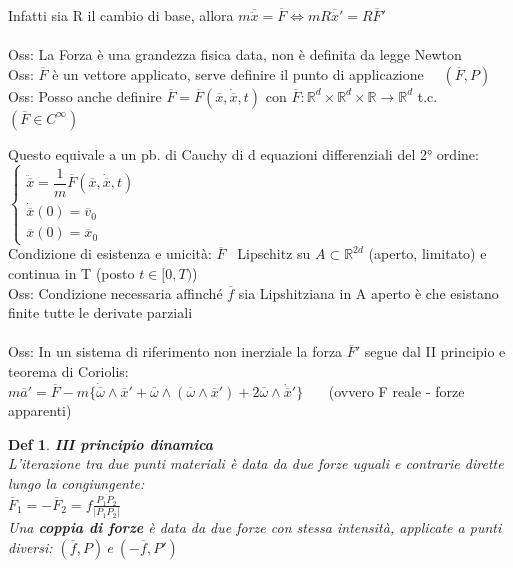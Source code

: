 \documentclass{article}
\theoremstyle{unnumbered}
\newtheorem* {theoremT}{Def}
\theoremstyle{unnumbered1}
\newenvironment{defi}{\begin{gBox}\begin{theoremT}}{\end{theoremT}\end{gBox}}
\begin{document}
Infatti sia R il cambio di base, allora $m\overline{\ddot{x}}=\overline{F} \Leftrightarrow mR\overline{\ddot{x}}'=R\overline{F}'$ \\ \\
%
%
%
Oss: La Forza è una grandezza fisica data, non è definita da legge Newton \\
Oss: $\overline{F}$ è un vettore applicato, serve definire il punto di applicazione \ \ $(\overline{F},P)$\\
Oss: Posso anche definire $\overline{F}=\overline{F}(\overline{x},\dot{\overline{x}},t)$ con $\overline{F}:\mathbb{R}^d\times\mathbb{R}^d\times\mathbb{R}\rightarrow\mathbb{R}^d$ t.c. $(\overline{F} \in C^\infty)$

Questo equivale a un pb. di Cauchy di d equazioni differenziali del 2° ordine: \ \ \ \
$\begin{cases}
\ddot{\overline{x}}=\dfrac{1}{m}\overline{F}( \overline{x},\dot{\overline{x}},t) \\
\dot{\overline{x}}(0) =\overline{v}_{0}\\
\overline{x}(0) =\overline{x}_{0}
\end{cases}$ \\
Condizione di esistenza e unicità: $\overline{F}$ \ Lipschitz su $A\subset\mathbb{R}^{2d}$ (aperto, limitato) e continua in T (posto $t\in[0,T)$)\\
Oss: Condizione necessaria affinché $\overline{f}$ sia Lipshitziana in A aperto è che esistano finite tutte le derivate parziali \\ \\
%
%
%
Oss: In un sistema di riferimento non inerziale la forza $\overline{F}'$ segue dal II principio e teorema di Coriolis: \\
\phantom{} \hspace{0.5in}  $m\overline{a}'=\overline{F} - m\{\dot{\overline{\omega}}\wedge\overline{x}'  +  \overline{\omega}\wedge(\overline{\omega}\wedge\overline{x}')  +  2\overline{\omega}\wedge\dot{\overline{x}}'\}$ \ \ \ (ovvero F reale - forze apparenti) \\
%
%
%
\begin{defi}
\textbf{III principio dinamica}\\
L'iterazione tra due punti materiali è data da due forze uguali e contrarie dirette lungo la congiungente:\\
\phantom{} \hspace{2in} $\overline{F}_1=-\overline{F}_2=f\frac{\overline{P_1P_2}}{|P_1P_2|}$\\
Una \textbf{coppia di forze} è data da due forze con stessa intensità, applicate a punti diversi: $(\overline{f},P) \ e \ (-\overline{f},P')$
\end{defi}
\end{document}
